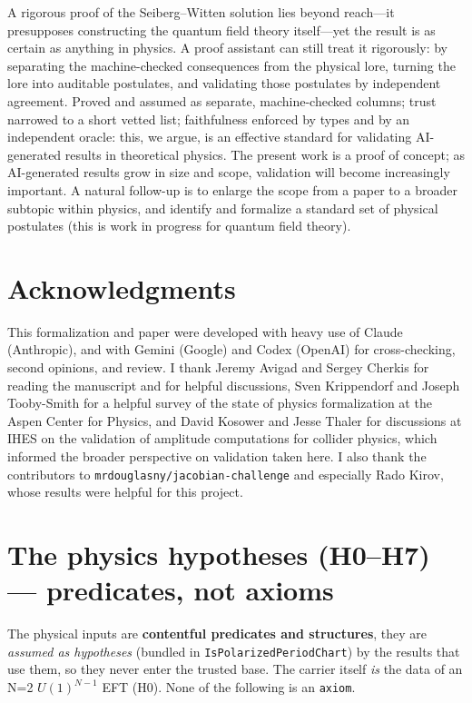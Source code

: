 \documentclass{article}
\theoremstyle{plain}
\theoremstyle{definition}
\numberwithin{equation}{section}
\newcommand{\code}[1]{\texttt{#1}}
\begin{document}
A rigorous proof of the Seiberg--Witten solution lies beyond reach---it presupposes
constructing the quantum field theory itself---yet the result is as certain as anything in
physics. A proof assistant can still treat it rigorously: by separating the machine-checked
consequences from the physical lore, turning the lore into auditable postulates, and validating those
postulates by independent agreement. Proved and assumed as separate, machine-checked columns; trust
narrowed to a short vetted list; faithfulness enforced by types and by an independent oracle:
this, we argue, is an effective standard for validating AI-generated results in theoretical
physics. The present work is a proof of concept; as AI-generated results grow in size and
scope, validation will become increasingly important.
A natural follow-up is to enlarge the scope from a paper to a broader subtopic within physics, and
identify and formalize a standard set of physical
postulates (this is work in progress for quantum field theory).

\section*{Acknowledgments}
This formalization and paper were developed with heavy use of Claude (Anthropic), and with
Gemini (Google) and Codex (OpenAI) for cross-checking, second opinions, and review. I thank
Jeremy Avigad and Sergey Cherkis for reading the manuscript and for helpful discussions, Sven Krippendorf and Joseph Tooby-Smith
for a helpful survey of the state of physics formalization at the Aspen Center for Physics, and
David Kosower and Jesse Thaler for discussions at IHES on the validation of amplitude computations for
collider physics, which informed the broader perspective on validation taken here.  I also thank
the contributors to {\tt mrdouglasny/jacobian-challenge} and especially Rado Kirov, whose results 
were helpful for this project.



\appendix

\section{The physics hypotheses (H0--H7) --- predicates, not axioms}

The physical inputs are \textbf{contentful predicates and
structures},  they are \emph{assumed as hypotheses} (bundled in
\code{IsPolarizedPeriodChart}) by the results that use them, so they never enter the trusted base.
The carrier itself \emph{is} the data of an N=2 $U(1)^{N-1}$ EFT (H0). None of the following is
an \code{axiom}.
\end{document}
